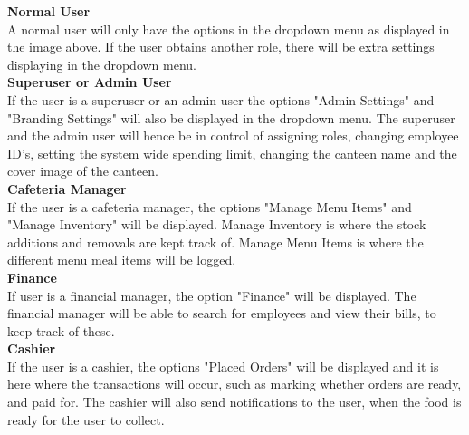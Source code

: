 \documentclass[a4paper,12pt]{report}
\begin{document}
\textbf{Normal User}\\
A normal user will only have the options in the dropdown menu as displayed in the image above. If the user obtains another role, there will be extra settings displaying in the dropdown menu.\\

\textbf{Superuser or Admin User}\\
If the user is a superuser or an admin user the options "Admin Settings" and "Branding Settings" will also be displayed in the dropdown menu. The superuser and the admin user will hence be in control of assigning roles, changing employee ID's, setting the system wide spending limit, changing the canteen name and the cover image of the canteen.  \\

\textbf{Cafeteria Manager}\\
If the user is a cafeteria manager, the options "Manage Menu Items" and "Manage Inventory" will be displayed. Manage Inventory is where the stock additions and removals are kept track of. Manage Menu Items  is where the different menu meal items will be logged.\\

\textbf{Finance}\\
If user is a financial manager, the option "Finance" will be displayed. The financial manager will be able to search for employees and view their bills, to keep track of these.\\

\textbf{Cashier}\\
If the user is a cashier, the options "Placed Orders" will be displayed and it is here where the transactions will occur, such as marking whether orders are ready, and paid for. The cashier will also send notifications to the user, when the food is ready for the user to collect. 

\end{document}
